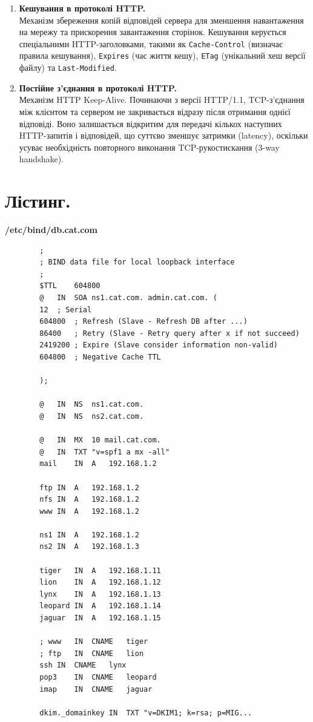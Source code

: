 \documentclass[14pt, a4paper]{extreport}
\begin{document}
\begin{enumerate}
		\item \textbf{Кешування в протоколі HTTP.} \\ Механізм збереження копій відповідей сервера для зменшення навантаження на мережу та прискорення завантаження сторінок. Кешування керується спеціальними HTTP-заголовками, такими як \texttt{Cache-Control} (визначає правила кешування), \texttt{Expires} (час життя кешу), \texttt{ETag} (унікальний хеш версії файлу) та \texttt{Last-Modified}.
		
		\item \textbf{Постійне з’єднання в протоколі HTTP.} \\ Механізм HTTP Keep-Alive. Починаючи з версії HTTP/1.1, TCP-з'єднання між клієнтом та сервером не закривається відразу після отримання однієї відповіді. Воно залишається відкритим для передачі кількох наступних HTTP-запитів і відповідей, що суттєво зменшує затримки (latency), оскільки усуває необхідність повторного виконання TCP-рукостискання (3-way handshake).
	\end{enumerate}
	
	\pagebreak
	
	\section*{Лістинг.}
	
	\textbf{/etc/bind/db.cat.com}
	
	\begin{verbatim} 
		;
		; BIND data file for local loopback interface
		;
		$TTL	604800
		@	IN	SOA	ns1.cat.com. admin.cat.com. (
		12	; Serial
		604800	; Refresh (Slave - Refresh DB after ...)
		86400	; Retry (Slave - Retry query after x if not succeed)
		2419200	; Expire (Slave consider information non-valid)
		604800	; Negative Cache TTL	
		
		);
		
		@	IN	NS	ns1.cat.com.
		@	IN	NS	ns2.cat.com.
		
		@	IN	MX	10 mail.cat.com.
		@	IN	TXT	"v=spf1 a mx -all"
		mail	IN	A	192.168.1.2
		
		ftp	IN	A	192.168.1.2
		nfs	IN	A	192.168.1.2
		www	IN	A	192.168.1.2
		
		ns1	IN	A	192.168.1.2
		ns2	IN	A	192.168.1.3
		
		tiger	IN	A	192.168.1.11
		lion	IN	A	192.168.1.12
		lynx	IN	A	192.168.1.13
		leopard	IN	A	192.168.1.14
		jaguar	IN	A	192.168.1.15
		
		; www 	IN	CNAME	tiger
		; ftp	IN	CNAME	lion
		ssh	IN	CNAME	lynx
		pop3	IN	CNAME	leopard
		imap	IN	CNAME	jaguar
		
		dkim._domainkey	IN	TXT	"v=DKIM1; k=rsa; p=MIG...
	\end{verbatim}
	
\end{document}
